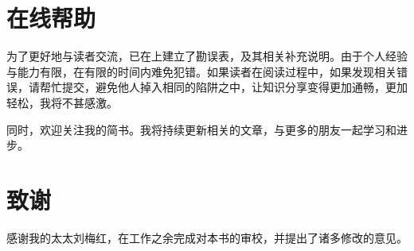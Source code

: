 





\section*{在线帮助}

\begin{content}

为了更好地与读者交流，已在上建立了勘误表，及其相关补充说明。由于个人经验与能力有限，在有限的时间内难免犯错。如果读者在阅读过程中，如果发现相关错误，请帮忙提交，避免他人掉入相同的陷阱之中，让知识分享变得更加通畅，更加轻松，我将不甚感激。

同时，欢迎关注我的简书。我将持续更新相关的文章，与更多的朋友一起学习和进步。

\begin{enum}
\end{enum}

\end{content}

\section*{致谢}

\begin{content}

感谢我的太太刘梅红，在工作之余完成对本书的审校，并提出了诸多修改的意见。

\end{content}
